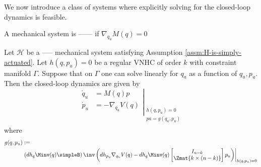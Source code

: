 We now introduce a class of systems where explicitly solving for the closed-loop
dynamics is feasible.

\begin{defn}
    A mechanical system is ------ if \(\nabla_{q_u}M(q) = 0\)
\end{defn}

\begin{thm}\label{thm:zero-dynamics}
    Let \(\mathcal{H}\) be a ----- mechanical system satisfying Assumption
    \ref{assm:H-is-simply-actuated}. Let
    \(h(q,p_u) = 0\) be a regular VNHC of order \(k\) 
    with constraint manifold \(\Gamma\). Suppose that on \(\Gamma\) one can
    solve linearly for \(q_a\) as a function of \(q_u,p_u\).
    Then the closed-loop dynamics are given by
    \begin{equation}\label{eqn:qpu-dynamics}
        \left.\begin{aligned}
            \dot{q}_u &= M(q)p \\
            \dot{p}_u &= -\nabla_{q_u}V(q) \\
            \end{aligned}\right|_{\begin{array}{c}
                h(q,p_u) = 0 \\ 
                pa = g(q_u,p_u) \\
            \end{array}}
    \end{equation}
    where
    \begin{equation}\label{eqn:g-qpu}
    \begin{aligned}
        g(q,p_u) &:= \\
           &\left.\left(dh_q \Minv(q) \simpleB \right)\inv 
        \left(dh_{p_u} \nabla_{q_u}V(q) - dh_q \Minv(q)
        \begin{bmatrix}
            I_{n-k} \\
            \Zmat{k \times (n-k)} \\
        \end{bmatrix} p_u\right)\right|_{h(q,p_u) = 0}
    \end{aligned}
    \end{equation}
\end{thm}
